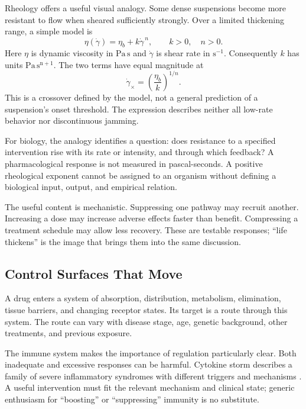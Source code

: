 \documentclass[11pt,openany]{book}
\begin{document}
Rheology offers a useful visual analogy. Some dense suspensions become more resistant to flow when sheared sufficiently strongly. Over a limited thickening range, a simple model is
\begin{equation}
 \eta(\dot\gamma)=\eta_b+k\dot\gamma^{\,n},
 \qquad k>0,\quad n>0.
\end{equation}
Here $\eta$ is dynamic viscosity in $\mathrm{Pa\,s}$ and $\dot\gamma$ is shear rate in $\mathrm{s^{-1}}$. Consequently $k$ has units $\mathrm{Pa\,s^{n+1}}$. The two terms have equal magnitude at
\begin{equation}
 \dot\gamma_\times=\left(\frac{\eta_b}{k}\right)^{1/n}.
\end{equation}
This is a crossover defined by the model, not a general prediction of a suspension's onset threshold. The expression describes neither all low-rate behavior nor discontinuous jamming.

For biology, the analogy identifies a question: does resistance to a specified intervention rise with its rate or intensity, and through which feedback? A pharmacological response is not measured in pascal-seconds. A positive rheological exponent cannot be assigned to an organism without defining a biological input, output, and empirical relation.

The useful content is mechanistic. Suppressing one pathway may recruit another. Increasing a dose may increase adverse effects faster than benefit. Compressing a treatment schedule may allow less recovery. These are testable responses; “life thickens” is the image that brings them into the same discussion.

\subsection{Control Surfaces That Move}

A drug enters a system of absorption, distribution, metabolism, elimination, tissue barriers, and changing receptor states. Its target is a route through this system. The route can vary with disease stage, age, genetic background, other treatments, and previous exposure.

The immune system makes the importance of regulation particularly clear. Both inadequate and excessive responses can be harmful. Cytokine storm describes a family of severe inflammatory syndromes with different triggers and mechanisms \cite{fajgenbaum2020cytokinestorm}. A useful intervention must fit the relevant mechanism and clinical state; generic enthusiasm for “boosting” or “suppressing” immunity is no substitute.
\end{document}
